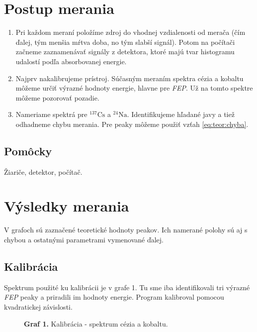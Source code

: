 \documentclass[a4paper, 10pt]{article}
\begin{document}
\section*{Postup merania}
\begin{enumerate}
\item Pri každom meraní položíme zdroj do vhodnej vzdialenosti od merača (čím ďalej, tým menšia mŕtva doba, no tým slabší signál). Potom na počítači začneme zaznamenávať signály z detektora, ktoré majú tvar histogramu udalostí podľa absorbovanej energie.
\item Najprv nakalibrujeme prístroj. Súčasným meraním spektra cézia a kobaltu môžeme určiť výrazné hodnoty energie, hlavne pre \textit{FEP}. Už na tomto spektre môžeme pozorovať pozadie.
\item Nameriame spektrá pre $^{137}\mathrm{Cs}$ a $^{24}\mathrm{Na}$. Identifikujeme hľadané javy a tiež odhadneme chybu merania. Pre peaky môžeme použiť vzťah \ref{eq:teor:chyba}.

\end{enumerate}
\subsection*{Pomôcky}
Žiariče, detektor, počítač.

\section*{Výsledky merania}

V grafoch sú zaznačené teoretické hodnoty peakov. Ich namerané polohy sú aj s chybou a ostatnými parametrami vymenované ďalej.

\subsection*{Kalibrácia}
Spektrum použité ku kalibrácii je v grafe 1. Tu sme iba identifikovali tri výrazné \textit{FEP} peaky a priradili im hodnoty energie. Program kalibroval pomocou kvadratickej závislosti.

\begin{figure}[h!]
\centering

\textbf{Graf 1.} Kalibrácia - spektrum cézia a kobaltu. 
\end{figure}

\end{document}
